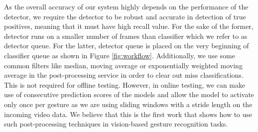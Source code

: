 As the overall accuracy of our system highly depends on the performance of the detector, we require the detector to be robust and accurate in detection of true positives, meaning that it must have high recall value.  For the sake of the former, detector runs on a smaller number of frames than classifier which we refer to as detector queue.   For the latter, detector queue is placed on the very beginning of classifier queue as shown in Figure \ref{fig:workflow}. Additionally,  we use some common filters like median,  moving average or exponentially weighted moving average in the post-processing service in order to clear out miss classifications.  This is not required for offline testing.   However, in online testing, we can make use of consecutive prediction scores of the models and allow the model to activate only once per gesture as we are using sliding windows with a stride length on the incoming video data.   We believe that this is the first work that shows how to use such post-processing techniques in vision-based gesture recognition tasks.\\
